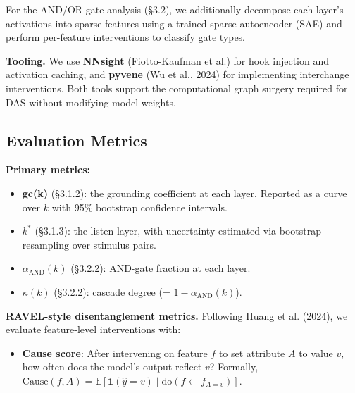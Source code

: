 \documentclass[a4paper]{article}
\begin{document}
For the AND/OR gate analysis (§3.2), we additionally decompose each layer's activations into sparse features using a trained sparse autoencoder (SAE) and perform per-feature interventions to classify gate types.

\textbf{Tooling.} We use \textbf{NNsight} (Fiotto-Kaufman et al.) for hook injection and activation caching, and \textbf{pyvene} (Wu et al., 2024) for implementing interchange interventions. Both tools support the computational graph surgery required for DAS without modifying model weights.

\subsection{Evaluation Metrics}

\textbf{Primary metrics:}

\begin{itemize}
\item \textbf{gc(k)} (§3.1.2): the grounding coefficient at each layer. Reported as a curve over $k$ with 95\% bootstrap confidence intervals.
\end{itemize}

\begin{itemize}
\item \textbf{$k^*$} (§3.1.3): the listen layer, with uncertainty estimated via bootstrap resampling over stimulus pairs.
\end{itemize}

\begin{itemize}
\item \textbf{$\alpha_{\text{AND}}(k)$} (§3.2.2): AND-gate fraction at each layer.
\end{itemize}

\begin{itemize}
\item \textbf{$\kappa(k)$} (§3.2.2): cascade degree (= $1 - \alpha_{\text{AND}}(k)$).
\end{itemize}

\textbf{RAVEL-style disentanglement metrics.} Following Huang et al. (2024), we evaluate feature-level interventions with:

\begin{itemize}
\item \textbf{Cause score}: After intervening on feature $f$ to set attribute $A$ to value $v$, how often does the model's output reflect $v$? Formally, $\text{Cause}(f, A) = \mathbb{E}[\mathbf{1}(\hat{y} = v) \mid \text{do}(f \leftarrow f_{A=v})]$.
\end{itemize}
\end{document}
